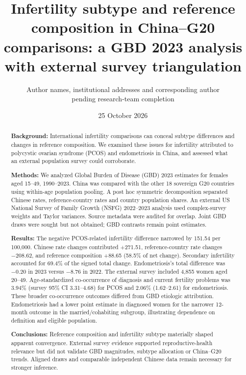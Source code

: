 \documentclass[11pt,a4paper]{article}
\title{Infertility subtype and reference composition in China--G20 comparisons: a GBD 2023 analysis with external survey triangulation}
\author{\parbox{0.9\textwidth}{\centering Author names, institutional addresses and corresponding author\\pending research-team completion}}
\date{25 October 2026}
\begin{document}
\maketitle
\linenumbers
\begin{abstract}
\noindent\textbf{Background:} International infertility comparisons can conceal subtype differences and changes in reference composition. We examined these issues for infertility attributed to polycystic ovarian syndrome (PCOS) and endometriosis in China, and assessed what an external population survey could corroborate.

\noindent\textbf{Methods:} We analyzed Global Burden of Disease (GBD) 2023 estimates for females aged 15--49, 1990--2023. China was compared with the other 18 sovereign G20 countries using within-age population pooling. A post hoc symmetric decomposition separated Chinese rates, reference-country rates and country population shares. An external US National Survey of Family Growth (NSFG) 2022--2023 analysis used complex-survey weights and Taylor variances. Source metadata were audited for overlap. Joint GBD draws were sought but not obtained; GBD contrasts remain point estimates.

\noindent\textbf{Results:} The negative PCOS-related infertility difference narrowed by 151.54 per 100,000. Chinese rate changes contributed +271.51, reference-country rate changes $-208.62$, and reference composition +88.65 (58.5\% of net change). Secondary infertility accounted for 69.4\% of the signed total change. Endometriosis's total difference was $-0.20$ in 2023 versus $-8.76$ in 2022. The external survey included 4,855 women aged 20--49. Age-standardized co-occurrence of diagnosis and current fertility problems was 3.94\% (survey 95\% CI 3.31--4.68) for PCOS and 2.06\% (1.62--2.61) for endometriosis. These broader co-occurrence outcomes differed from GBD etiologic attribution. Endometriosis had a lower point estimate in diagnosed women for the narrower 12-month outcome in the married/cohabiting subgroup, illustrating dependence on definition and eligible population.

\noindent\textbf{Conclusions:} Reference composition and infertility subtype materially shaped apparent convergence. External survey evidence supported reproductive-health relevance but did not validate GBD magnitudes, subtype allocation or China--G20 trends. Aligned draws and comparable independent Chinese data remain necessary for stronger inference.
\end{abstract}
\end{document}
